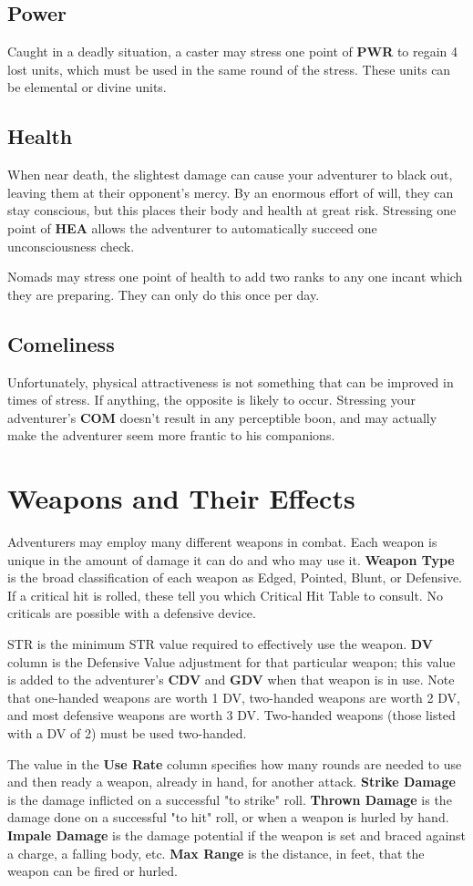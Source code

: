 \begin{multicols*}{2}
\subsection{Power}
Caught in a deadly situation, a caster may stress one point of \textbf{PWR} to regain 4 lost units, which must be used in the same round of the stress. These units can be elemental or divine units.
\subsection{Health}
When near death, the slightest damage can cause your adventurer to black out, leaving them at their opponent's mercy. By an enormous effort of will, they can stay conscious, but this places their body and health at great risk. Stressing one point of \textbf{HEA} allows the adventurer to automatically succeed one unconsciousness check.

Nomads may stress one point of health to add two ranks to any one incant which they are preparing. They can only do this once per day.
\subsection{Comeliness}
Unfortunately, physical attractiveness is not something that can be improved in times of stress. If anything, the opposite is likely to occur. Stressing your adventurer's \textbf{COM} doesn't result in any perceptible boon, and may actually make the adventurer seem more frantic to his companions.
\section{Weapons and Their Effects}
Adventurers may employ many different weapons in combat. Each weapon is unique in the amount of damage it can do and who may use it.
\textbf{Weapon Type} is the broad classification of each
weapon as Edged, Pointed, Blunt, or Defensive. If a critical hit is rolled, these tell you which Critical Hit Table to consult. No criticals are possible with a defensive device.

STR is the minimum STR value required to effectively use the weapon. \textbf{DV} column is the Defensive Value adjustment for that particular weapon; this value is added to the adventurer's \textbf{CDV} and \textbf{GDV} when that weapon is in use. Note that one-handed weapons are worth 1 DV, two-handed weapons are worth 2 DV, and most defensive weapons are worth 3 DV. Two-handed weapons (those listed with a DV of 2) must be used two-handed.

The value in the \textbf{Use Rate} column specifies how many rounds are needed to use and then ready a weapon, already in hand, for another attack. \textbf{Strike Damage} is the damage inflicted on a successful "to strike" roll. \textbf{Thrown Damage} is the damage done on a successful "to hit" roll, or when a weapon is hurled by hand. \textbf{Impale Damage} is the damage potential if the weapon is set and braced against a charge, a falling body, etc. \textbf{Max Range} is the distance, in feet, that the weapon can be fired or hurled.
\end{multicols*}
